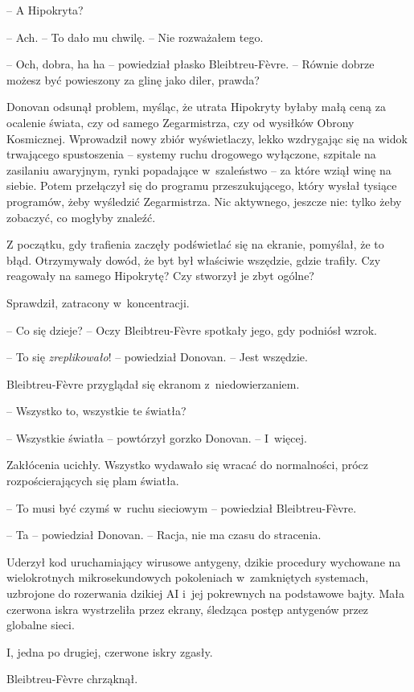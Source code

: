 \documentclass[oneside,polish,11pt,sfheadings]{mwbk}
\begin{document}
-- A Hipokryta?

-- Ach. -- To dało mu chwilę. -- Nie rozważałem tego.

-- Och, dobra, ha ha -- powiedział płasko Bleibtreu-Fèvre. -- Równie dobrze
możesz być powieszony za glinę jako diler, prawda?

Donovan odsunął problem, myśląc, że utrata Hipokryty byłaby małą ceną za
ocalenie świata, czy od samego Zegarmistrza, czy od wysiłków Obrony
Kosmicznej. Wprowadził nowy zbiór wyświetlaczy, lekko wzdrygając się na
widok trwającego spustoszenia -- systemy ruchu drogowego wyłączone,
szpitale na zasilaniu awaryjnym, rynki popadające w~szaleństwo -- za
które wziął winę na siebie. Potem przełączył się do programu
przeszukującego, który wysłał tysiące programów, żeby wyśledzić
Zegarmistrza. Nic aktywnego, jeszcze nie: tylko żeby zobaczyć, co
mogłyby znaleźć.

Z początku, gdy trafienia zaczęły podświetlać się na ekranie, pomyślał,
że to błąd. Otrzymywały dowód, że byt był właściwie wszędzie, gdzie
trafiły. Czy reagowały na samego Hipokrytę? Czy stworzył je zbyt ogólne?

Sprawdził, zatracony w~koncentracji.

-- Co się dzieje? -- Oczy Bleibtreu-Fèvre spotkały jego, gdy podniósł
wzrok.

-- To się \emph{zreplikowało}! -- powiedział Donovan. -- Jest wszędzie.

Bleibtreu-Fèvre przyglądał się ekranom z~niedowierzaniem. 

-- Wszystko to,
wszystkie te światła?

-- Wszystkie światła -- powtórzył gorzko Donovan. -- I~więcej.

Zakłócenia ucichły. Wszystko wydawało się wracać do normalności, prócz
rozpościerających się plam światła.

-- To musi być czymś w~ruchu sieciowym -- powiedział Bleibtreu-Fèvre.

-- Ta -- powiedział Donovan. -- Racja, nie ma czasu do stracenia.

Uderzył kod uruchamiający wirusowe antygeny, dzikie procedury wychowane
na wielokrotnych mikrosekundowych pokoleniach w~zamkniętych systemach,
uzbrojone do rozerwania dzikiej AI i~jej pokrewnych na podstawowe bajty.
Mała czerwona iskra wystrzeliła przez ekrany, śledząca postęp antygenów
przez globalne sieci.

I, jedna po drugiej, czerwone iskry zgasły.

Bleibtreu-Fèvre chrząknął. 
\end{document}
